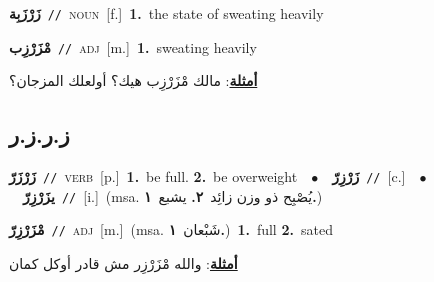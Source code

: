 \documentclass[10pt,a4paper,twoside]{article} %
\begin{document}
\begin{multicols}{2}
{\setlength\topsep{0pt}\textbf{\foreignlanguage{arabic}{زَرْزَبِة}}\ {\color{gray}\texttt{//}\color{black}}\ \textsc{noun}\ [f.]\ \textbf{1.}~the state of sweating heavily\ } \vspace{2mm}

{\setlength\topsep{0pt}\textbf{\foreignlanguage{arabic}{مْزَرْزِب}}\ {\color{gray}\texttt{//}\color{black}}\ \textsc{adj}\ [m.]\ \textbf{1.}~sweating heavily\  \begin{flushright}\color{gray}\foreignlanguage{arabic}{\textbf{\underline{\foreignlanguage{arabic}{أمثلة}}}: مالك مْزَرْزِب هيك؟ أولعلك المزجان؟}\end{flushright}\color{black}} \vspace{2mm}

\vspace{-3mm}
\subsection*{\color{blue}\foreignlanguage{arabic}{ز.ر.ز.ر}\color{blue}{}} 

{\setlength\topsep{0pt}\textbf{\foreignlanguage{arabic}{زَرْزَرّ}}\ {\color{gray}\texttt{//}\color{black}}\ \textsc{verb}\ [p.]\ \textbf{1.}~be full.  \textbf{2.}~be overweight\ \ $\bullet$\ \ \setlength\topsep{0pt}\textbf{\foreignlanguage{arabic}{زَرْزِرّ}}\ {\color{gray}\texttt{//}\color{black}}\ [c.]\ \ $\bullet$\ \ \setlength\topsep{0pt}\textbf{\foreignlanguage{arabic}{يزَرْزِرّ}}\ {\color{gray}\texttt{//}\color{black}}\ [i.]\ \color{gray}(msa. \foreignlanguage{arabic}{يُصْبِح ذو وزن زائِد}~\foreignlanguage{arabic}{\textbf{٢.}}  \foreignlanguage{arabic}{يشبع}~\foreignlanguage{arabic}{\textbf{١.}})\color{black}\ } \vspace{2mm}

{\setlength\topsep{0pt}\textbf{\foreignlanguage{arabic}{مْزَرْزِرّ}}\ {\color{gray}\texttt{//}\color{black}}\ \textsc{adj}\ [m.]\ \color{gray}(msa. \foreignlanguage{arabic}{شَبْعان}~\foreignlanguage{arabic}{\textbf{١.}})\color{black}\ \textbf{1.}~full  \textbf{2.}~sated\  \begin{flushright}\color{gray}\foreignlanguage{arabic}{\textbf{\underline{\foreignlanguage{arabic}{أمثلة}}}: والله مْزَرْزِر مش قادر أوكل كمان}\end{flushright}\color{black}} \vspace{2mm}


\end{multicols}
\end{document}
